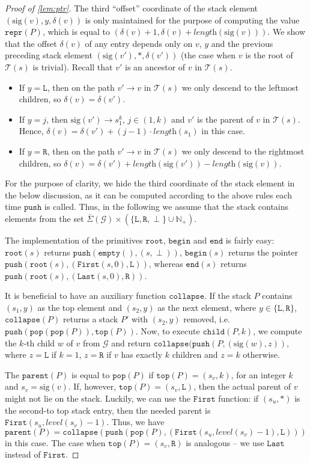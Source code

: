 \documentclass[a4paper]{article}
\theoremstyle{remark}
\newcommand{\sigs}{\bar{\Sigma}}
\newcommand{\grammar}{\mathcal{G}}
\newcommand{\slev}{\textit{level}}
\newcommand{\slength}{\textit{length}}
\newcommand{\stree}{\mathcal{T}}
\newcommand{\ussig}{\mathrm{sig}}
\newcommand{\itroot}{\mathtt{root}}
\newcommand{\itbegin}{\mathtt{begin}}
\newcommand{\itend}{\mathtt{end}}
\newcommand{\itparent}{\mathtt{parent}}
\newcommand{\itchild}{\mathtt{child}}
\newcommand{\itrepr}{\mathtt{repr}}
\newcommand{\itfirst}{\mathtt{First}}
\newcommand{\itlast}{\mathtt{Last}}
\newcommand{\stpush}{\mathtt{push}}
\newcommand{\stpop}{\mathtt{pop}}
\newcommand{\sttop}{\mathtt{top}}
\newcommand{\stempty}{\mathtt{empty}}
\newcommand{\stcomp}{\mathtt{collapse}}
\begin{document}
\begin{proof}[Proof of \cref{lem:ptr}]
The third ``offset'' coordinate of the stack element $(\ussig(v),y,\delta(v))$ is only
maintained for the purpose of computing the value $\itrepr(P)$, which
is equal to $(\delta(v)+1,\delta(v)+\slength(\ussig(v)))$.
We show that the offset $\delta(v)$ of any entry depends
only on $v$, $y$ and the previous preceding stack element $(\ussig(v'),*,\delta(v'))$
(the case when $v$ is the root of $\stree(s)$ is trivial).
Recall that $v'$ is an ancestor of $v$ in $\stree(s)$.
\begin{itemize}
\item If $y=\texttt{L}$, then on the path $v'\to v$ in $\stree(s)$
  we only descend to the leftmost children, so $\delta(v)=\delta(v')$.
\item If $y=j$, then $\ussig(v')\to s_1^k$, $j\in(1,k)$ and
$v'$ is the parent of $v$ in $\stree(s)$.
Hence, $\delta(v)=\delta(v')+(j-1)\cdot\slength(s_1)$ in this case.
\item If $y=\texttt{R}$, then on the path $v'\to v$ in $\stree(s)$
  we only descend to the rightmost children, so
  $\delta(v)=\delta(v')+\slength(\ussig(v'))-\slength(\ussig(v))$.
\end{itemize}
For the purpose of clarity, we hide the third coordinate of the stack element
in the below discussion, as it can be computed according to the above
rules each time $\stpush$ is called.
Thus, in the following we assume that the stack contains
elements from the set $\sigs(\grammar)\times(\{\texttt{L},\texttt{R},\perp\}\cup\mathbb{N}_+)$.

The implementation of the primitives $\itroot$, $\itbegin$ and $\itend$
is fairly easy: $\itroot(s)$ returns $\stpush(\stempty(),\allowbreak (s,\perp))$,
$\itbegin(s)$ returns the pointer
$\stpush(\itroot(s),(\itfirst(s,0),\texttt{L}))$,
whereas $\itend(s)$ returns $\stpush(\itroot(s),\allowbreak(\itlast(s,0),\texttt{R}))$.

It is beneficial to have an auxiliary
function $\stcomp$.
If the stack $P$ contains $(s_1,y)$ as the top element
and $(s_2,y)$ as the next element, where $y\in \{\texttt{L},\texttt{R}\}$,
$\stcomp(P)$ returns a stack $P'$ with $(s_2,y)$ removed, i.e.
$\stpush(\stpop(\stpop(P)),\sttop(P))$.
Now, to execute $\itchild(P,k)$, we compute the $k$-th child $w$ of $v$
from $\grammar$ and return $\stcomp(\stpush(P,(\ussig(w),z))$,
where $z=\texttt{L}$ if $k=1$, $z=\texttt{R}$ if $v$ has exactly
$k$ children and $z=k$ otherwise.

The $\itparent(P)$ is equal to $\stpop(P)$ if $\sttop(P)=(s_v,k)$,
for an integer $k$ and $s_v=\ussig(v)$.
If, however, $\sttop(P)=(s_v,\texttt{L})$, then the actual parent
of $v$ might not lie on the stack.
Luckily, we can use the $\itfirst$ function: if $(s_u,*)$ is the second-to top stack
entry, then the needed parent is $\itfirst(s_u,\slev(s_v)-1)$.
Thus, we have $\itparent(P)=\stcomp(\stpush(\stpop(P),\allowbreak(\itfirst(s_u,\slev(s_v)-1),\texttt{L})))$
in this case.
The case when $\sttop(P)=(s_v,\texttt{R})$ is analogous -- we use $\itlast$
instead of $\itfirst$.


\end{proof}
\end{document}
